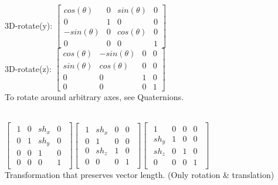 3D-rotate(y):
$\begin{bmatrix}
        cos(\theta) & 0 & sin(\theta) & 0 \\
        0 & 1 & 0 & 0 \\
        -sin(\theta) & 0 & cos(\theta) & 0\\
        0 & 0 & 0 & 1
\end{bmatrix}$\\
3D-rotate(z):
$\begin{bmatrix}
        cos(\theta) & -sin(\theta) & 0 & 0 \\
        sin(\theta) & cos(\theta) & 0 & 0 \\
        0 & 0 & 1 & 0\\
        0 & 0 & 0 & 1
\end{bmatrix}$\\
To rotate around arbitrary axes, see Quaternions. 

\\
$
\begin{bmatrix}
    \begin{smallmatrix}
    1 & 0 & sh_x & 0 \\
    0 & 1 & sh_y & 0 \\
    0 & 0 & 1 & 0 \\
    0 & 0 & 0 & 1
    \end{smallmatrix}
\end{bmatrix}
$$
\begin{bmatrix}
    \begin{smallmatrix}
    1 & sh_x & 0 & 0 \\
    0 & 1 & 0 & 0 \\
    0 & sh_z & 1 & 0 \\
    0 & 0 & 0 & 1
    \end{smallmatrix}
\end{bmatrix}
$$
\begin{bmatrix}
    \begin{smallmatrix}
    1 & 0 & 0 & 0 \\
    sh_y & 1 & 0 & 0 \\
    sh_z & 0 & 1 & 0 \\
    0 & 0 & 0 & 1
    \end{smallmatrix}
\end{bmatrix}
$\\
Transformation that preserves vector length. (Only rotation \& translation)

